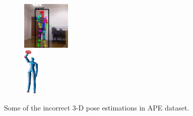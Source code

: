 \begin{figure}
\begin{subfigure}[t]{0.18\linewidth}
		\label{fig/body/APEerr3}
	\end{subfigure}
	\begin{subfigure}[t]{0.18\linewidth} \centering
		\includegraphics[height=2.3cm]{fig/body/APE/wave1err.jpg} \\
		\includegraphics[height=2.3cm]{fig/body/APE/wave1err.png} 
		\label{fig/body/APEerr4}
	\end{subfigure}
	\label{fig/body/APEerr}
	\caption{Some of the incorrect 3-D pose estimations in APE dataset.}
\end{figure}
